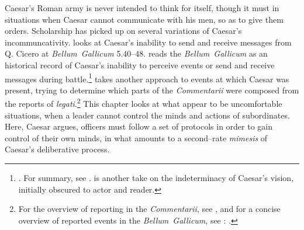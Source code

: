 \documentclass[12pt,letterpaper,oneside,final]{memoir}
\begin{document}
Caesar's Roman army is never intended to think for itself, though it must in situations when Caesar cannot communicate with his men, so as to give them orders. Scholarship has picked up on several variations of Caesar's incommuncativity. \textcite[93--95]{riggsby2006} looks at Caesar's inability to send and receive messages from Q. Cicero at \emph{Bellum~Gallicum} 5.40--48. \textcite[99--200]{kagan2006} reads the \emph{Bellum~Gallicum} as an historical record of Caesar's inability to perceive events or send and receive messages during battle.\footnote{. For summary, see \textcite[108--115]{kagan2006}. \textcite{glucklich2004} is another take on the indeterminacy of Caesar's vision, initially obscured to actor and reader.} \textcite[pp.~45--96, esp.~51--54]{rambaud1966} takes another approach to events at which Caesar was present, trying to determine which parts of the \emph{Commentarii} were composed from the reports of \emph{legati}.\footnote{For the overview of reporting in the \emph{Commentarii}, see \textcite[45--96]{rambaud1966}, and for a concise overview of reported events in the \emph{Bellum~Gallicum}, see \textcite[51--54]{rambaud1966}: .} This chapter looks at what appear to be uncomfortable situations, when a leader cannot control the minds and actions of subordinates. Here, Caesar argues, officers must follow a set of protocols in order to gain control of their own minds, in what amounts to a second--rate \emph{mimesis} of Caesar's deliberative process.
\end{document}
